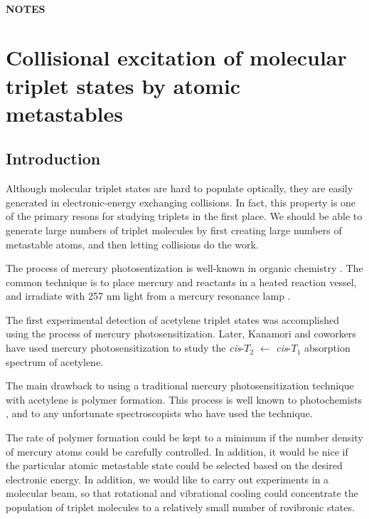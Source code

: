\documentclass[12pt]{mitthesis}
\begin{document}
\tableofcontents
\clearpage

\subsubsection*{NOTES}
\clearpage

\chapter{Collisional excitation of molecular triplet states by atomic
  metastables}

\section{Introduction}


Although molecular triplet states are hard to populate optically, they
are easily generated in electronic-energy exchanging collisions.  In
fact, this property is one of the primary resons for studying triplets
in the first place.  We should be able to generate large numbers of
triplet molecules by first creating large numbers of metastable atoms,
and then letting collisions do the work.

The process of mercury photosentization is well-known in organic
chemistry \cite{brown89, brown88, crabtree92, cvetanovic64,
  phillips74, strausz70}.  The common technique is to place mercury
and reactants in a heated reaction vessel, and irradiate with 257 nm
light from a mercury resonance lamp \cite{brown87}.

The first experimental detection of acetylene triplet states was
accomplished using the process of mercury photosensitization.  Later,
Kanamori and coworkers have used mercury photosensitization to study
the \emph{cis}-$T_2$ $\leftarrow$ \emph{cis}-$T_1$ absorption spectrum
of acetylene.

The main drawback to using a traditional mercury photosensitization
technique with acetylene is polymer formation.  This process is well
known to photochemists \cite{shida58, leroy44}, and to any unfortunate
spectroscopists who have used the technique.

The rate of polymer formation could be kept to a minimum if the number
density of mercury atoms could be carefully controlled.  In addition,
it would be nice if the particular atomic metastable state could be
selected based on the desired electronic energy.  In addition, we
would like to carry out experiments in a molecular beam, so that
rotational and vibrational cooling could concentrate the population of
triplet molecules to a relatively small number of rovibronic states.
\end{document}
